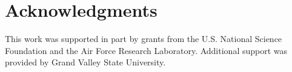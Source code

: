 \section*{Acknowledgments}
This work was supported in part by grants from the U.S. National Science Foundation and the Air Force Research Laboratory.  Additional support was provided by Grand Valley State University.